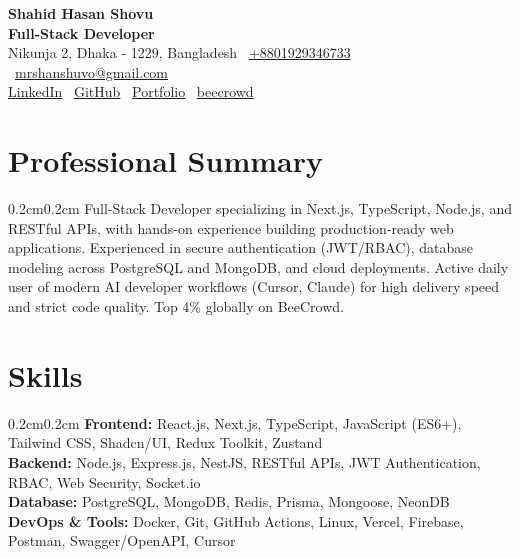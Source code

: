 \documentclass[10pt, a4paper]{article}
\newenvironment{onecolentry}{\begin{adjustwidth}{0.2cm}{0.2cm}}{\end{adjustwidth}}
\begin{document}
\begin{center}
    {\Huge \textbf{Shahid Hasan Shovu}} \\[3pt]
    \textbf{Full-Stack Developer}\\[3pt]
    Nikunja 2, Dhaka - 1229, Bangladesh \textbar\
    \href{https://wa.me/8801929346733}{+8801929346733} \textbar\
    \href{mailto:mrshanshuvo@gmail.com}{mrshanshuvo@gmail.com} \\[2pt]
    \href{https://www.linkedin.com/in/shahidhasanshovu/}{LinkedIn} \textbar\
    \href{https://github.com/mrshanshuvo}{GitHub} \textbar\
    \href{https://shahidhasanshuvo.vercel.app/}{Portfolio} \textbar\
    \href{https://judge.beecrowd.com/en/profile/917228}{beecrowd}
\end{center}

\section{Professional Summary}
\begin{onecolentry}
Full-Stack Developer specializing in Next.js, TypeScript, Node.js, and RESTful APIs, with hands-on experience building production-ready web applications. Experienced in secure authentication (JWT/RBAC), database modeling across PostgreSQL and MongoDB, and cloud deployments. Active daily user of modern AI developer workflows (Cursor, Claude) for high delivery speed and strict code quality. Top 4\% globally on BeeCrowd.
\end{onecolentry}

\section{Skills}
\begin{onecolentry}
\textbf{Frontend:} React.js, Next.js, TypeScript, JavaScript (ES6+), Tailwind CSS, Shadcn/UI, Redux Toolkit, Zustand \\
\textbf{Backend:} Node.js, Express.js, NestJS, RESTful APIs, JWT Authentication, RBAC, Web Security, Socket.io \\
\textbf{Database:} PostgreSQL, MongoDB, Redis, Prisma, Mongoose, NeonDB \\
\textbf{DevOps \& Tools:} Docker, Git, GitHub Actions, Linux, Vercel, Firebase, Postman, Swagger/OpenAPI, Cursor
\end{onecolentry}
\end{document}
